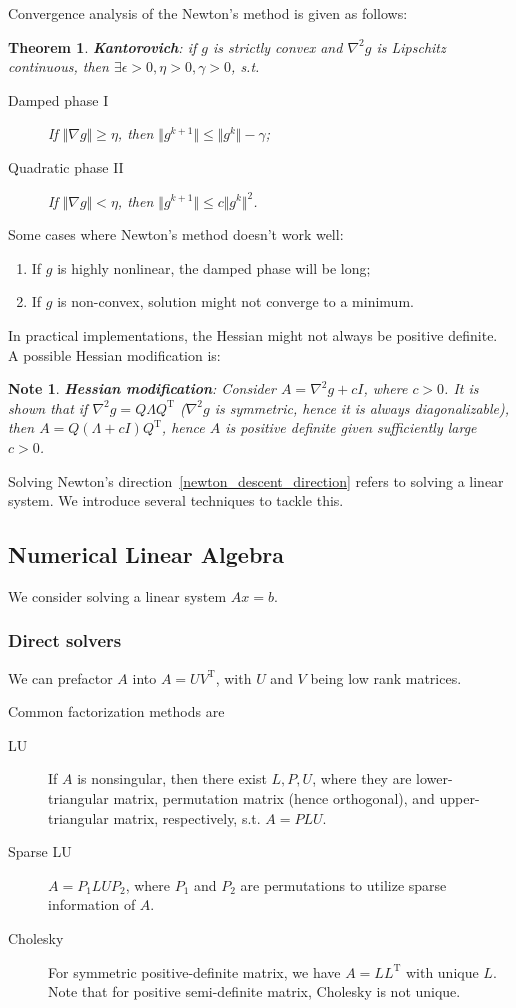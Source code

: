\documentclass{fancydoc}
\newtheorem{thm}{Theorem}
\newtheorem{note}{Note}
\newcommand{\trans}{\mathrm{T}}
\begin{document}
Convergence analysis of the Newton's method is given as follows:
\begin{thm}
\textbf{Kantorovich}: if $g$ is strictly convex and $\nabla^2 g$ is Lipschitz continuous, then $\exists \epsilon > 0, \eta > 0, \gamma > 0$, s.t.
\begin{description}
	\item[Damped phase I] If $\Vert\nabla g \Vert \geq \eta$, then $\Vert g^{k+1} \Vert \leq \Vert g^{k} \Vert - \gamma$;
	\item[Quadratic phase II] If $\Vert\nabla g \Vert < \eta$, then $\Vert g^{k+1} \Vert \leq c \Vert g^{k}\Vert^2$.
\end{description}
\end{thm}
Some cases where Newton's method doesn't work well:
\begin{enumerate}
	\item If $g$ is highly nonlinear, the damped phase will be long;
	\item If $g$ is non-convex, solution might not converge to a minimum.
\end{enumerate}
In practical implementations, the Hessian might not always be positive definite. A possible Hessian modification is:
\begin{note}
	\textbf{Hessian modification}: Consider $A = \nabla^2 g + cI$, where $c>0$. It is shown that if $\nabla^2 g = Q\Lambda Q^\trans$ ($\nabla^2 g$ is symmetric, hence it is always diagonalizable), then $A=Q(\Lambda + cI)Q^\trans$, hence $A$ is positive definite given sufficiently large $c>0$. 
\end{note}

Solving Newton's direction~\eqref{newton_descent_direction} refers to solving a linear system. We introduce several techniques to tackle this.

\subsection{Numerical Linear Algebra}
We consider solving a linear system $Ax = b$.
\subsubsection{Direct solvers}
We can prefactor $A$ into $A = UV^\trans$, with $U$ and $V$ being low rank matrices.

Common factorization methods are
\begin{description}
	\item[LU] If $A$ is nonsingular, then there exist $L,P,U$, where they are lower-triangular matrix, permutation matrix (hence orthogonal), and upper-triangular matrix, respectively, s.t. $A=PLU$.
	\item[Sparse LU] $A=P_1LUP_2$, where $P_1$ and $P_2$ are permutations to utilize sparse information of $A$.
	\item[Cholesky] For symmetric positive-definite matrix, we have $A = LL^\trans$ with unique $L$. Note that for positive semi-definite matrix, Cholesky is not unique.
\end{description}
 
\end{document}
